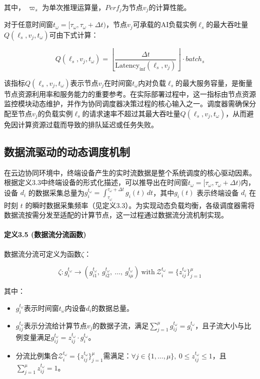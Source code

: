 其中， $\varpi_s$ 为单次推理运算量，$Perf_j$为节点$v_j$的计算性能。

对于任意时间窗$t_\omega = [\tau_\omega, \tau_\omega + \Delta t)$，节点$v_j$可承载的AI负载实例$\ell_s$的最大吞吐量$Q(\ell_s, v_j, t_\omega)$可由下式计算：

\begin{equation}
Q(\ell_s, v_j, t_\omega) = \left\lfloor \frac{\Delta t}{\text{Latency}_{\text{inf}}(\ell_s, v_j)} \right\rfloor \cdot batch_s
\end{equation}

该指标$Q(\ell_s, v_j, t_\omega)$表示节点$v_j$在时间窗$t_\omega$内对负载$\ell_s$的最大服务容量，是衡量节点资源利用率和服务能力的重要参考。在实际部署过程中，这一指标由节点资源监控模块动态维护，并作为协同调度器决策过程的核心输入之一。调度器需确保分配至节点$v_j$的负载实例$\ell_s$的请求速率不超过其最大吞吐量$Q(\ell_s, v_j, t_\omega)$，从而避免因计算资源过载而导致的排队延迟或任务失败。

\subsection{数据流驱动的动态调度机制}

在云边协同环境中，终端设备产生的实时流数据是整个系统调度的核心驱动因素。根据定义3.3中终端设备的形式化描述，可以推导出在时间窗$t_\omega = [\tau_\omega, \tau_\omega + \Delta t)$内，设备 $d_i$ 的数据采集总量为$g_i^{t_\omega} = \int_{\tau_\omega}^{\tau_\omega + \Delta t} g_i(t) \, dt$，其中$g_i(t)$ 表示终端设备 $d_i$ 在时刻 $t$ 的瞬时数据采集频率（见定义3.3）。为实现动态负载均衡，各级调度器需将数据流按需分发至适配的计算节点，这一过程通过数据流分流机制实现。

\paragraph{定义3.5 (数据流分流函数)} 数据流分流可定义为函数$\zeta$：

\[
\zeta: g_i^{t_\omega} \to \left( g_{i1}^{t_\omega},\ g_{i2}^{t_\omega},\ \dots,\ g_{i\mu}^{t_\omega} \right) \ \text{with} \ \mathcal{Z}_i^{t_\omega} = \{z_{ij}^{t_\omega}\}_{j=1}^\mu
\]

其中：
\begin{itemize}
    \item $g_i^{t_\omega}$表示时间窗$t_\omega$内设备$d_i$的数据总量。
    \item $g_{ij}^{t_\omega}$表示分流给计算节点$v_j$的数据子流，满足$\sum\limits_{j=1}^\mu g_{ij}^{t_\omega} = g_i^{t_\omega}$，且子流大小与比例变量满足$g_{ij}^{t_\omega} = z_{ij}^{t_\omega} \cdot g_i^{t_\omega}$。
    \item 分流比例集合$\mathcal{Z}_i^{t_\omega} = \{z_{ij}^{t_\omega}\}_{j=1}^\mu$需满足：$\forall j \in \{1,\dots,\mu\},\ 0 \leq z_{ij}^{t_\omega} \leq 1$，且$\sum\limits_{j=1}^\mu z_{ij}^{t_\omega} = 1$。
\end{itemize}


